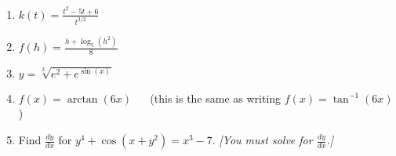 \documentclass[12pt]{article}
\renewcommand{\emph}[1]{\textsf{\textbf{#1}}}
\newcounter{probcount}
\newcounter{subprobcount}
\newenvironment{subproblems}{%
\begin{enumerate}%
\setcounter{enumi}{\value{subprobcount}}%
\renewcommand{\theenumi}{\emph{\alph{enumi}}}}%
{\setcounter{subprobcount}{\value{enumi}}\end{enumerate}}
\newcommand{\ds}{\displaystyle}
\begin{document}
\begin{subproblems}
\vfill

\item   $\ds k(t) = \frac{t^{2} - 5t + 6}{t^{3/2}} $
\vfill

\item   $\ds f(h) = \frac{h+\log_{5}(h^2)}{8}$\\


\vfill



\newpage


\item   $\ds y = \sqrt[3]{e^2+e^{\sin(x)}}$\\


\vfill
\vfill

\item  $\ds f(x)= \arctan{(6x)}$ $\quad$ (this is the same as writing $\ds f(x)=\tan^{-1}{(6x)}$)
\vfill

\item  Find $\ds \frac{dy}{dx}$ for $\ds 
y^{4} + \cos(x + y^{2}) = x^{3} - 7
.$ {\it [You must solve for $\ds \frac{dy}{dx}$.]}\\




\vfill
\vfill



\end{subproblems}
\end{document}

